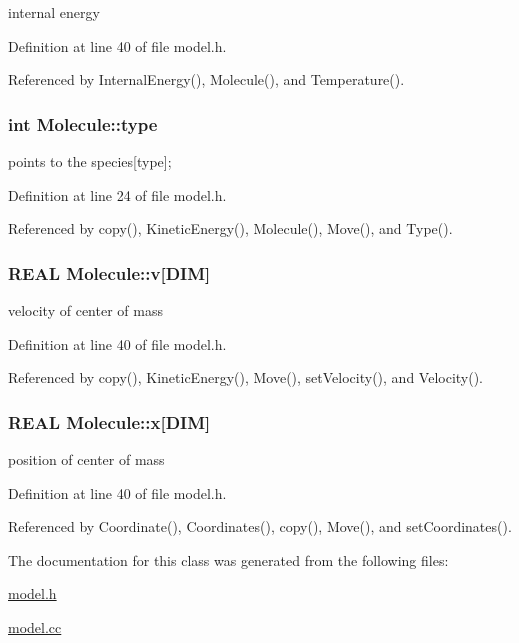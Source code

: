 internal energy 



Definition at line 40 of file model.h.

Referenced by InternalEnergy(), Molecule(), and Temperature().\hypertarget{classMolecule_3e459e9ae52f281073d4821b9af72b60}{
\subsubsection[{type}]{\setlength{\rightskip}{0pt plus 5cm}int {\bf Molecule::type}}}
\label{classMolecule_3e459e9ae52f281073d4821b9af72b60}


points to the species\mbox{[}type\mbox{]}; 



Definition at line 24 of file model.h.

Referenced by copy(), KineticEnergy(), Molecule(), Move(), and Type().\hypertarget{classMolecule_91748f8e6a013950f86e50861eb7fc2f}{
\subsubsection[{v}]{\setlength{\rightskip}{0pt plus 5cm}REAL {\bf Molecule::v}\mbox{[}DIM\mbox{]}}}
\label{classMolecule_91748f8e6a013950f86e50861eb7fc2f}


velocity of center of mass 



Definition at line 40 of file model.h.

Referenced by copy(), KineticEnergy(), Move(), setVelocity(), and Velocity().\hypertarget{classMolecule_21a3fe802207db2ce796f30864c4d131}{
\subsubsection[{x}]{\setlength{\rightskip}{0pt plus 5cm}REAL {\bf Molecule::x}\mbox{[}DIM\mbox{]}}}
\label{classMolecule_21a3fe802207db2ce796f30864c4d131}


position of center of mass 



Definition at line 40 of file model.h.

Referenced by Coordinate(), Coordinates(), copy(), Move(), and setCoordinates().

The documentation for this class was generated from the following files:\begin{CompactItemize}
\item 
\hyperlink{model_8h}{model.h}\item 
\hyperlink{model_8cc}{model.cc}\end{CompactItemize}

